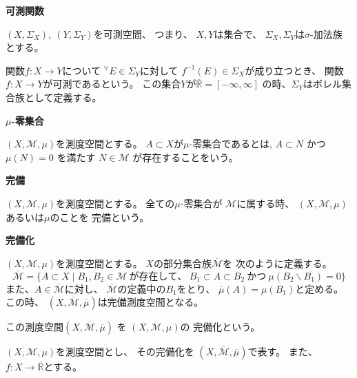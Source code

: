 \documentclass[12pt,b5paper]{ltjsarticle}
\begin{document}
\textbf{可測関数}

$(X,\Sigma_{X}), \: (Y,\Sigma_{Y})$を可測空間、
つまり、
$X,Y$は集合で、
$\Sigma_{X},\Sigma_{Y}$は$\sigma$-加法族
とする。

関数$f: X\to Y$について
${}^{\forall}E\in \Sigma_{Y}$に対して
$f^{-1}(E)\in\Sigma_{X}$が成り立つとき、
関数$f: X\to Y$が可測であるという。
この集合$Y$が$\overline{\mathbb{R}}=[-\infty,\infty]$
の時、$\Sigma_{Y}$はボレル集合族として定義する。



\textbf{$\mu$-零集合}

$(X, \mathcal{M}, \mu)$を測度空間とする。
$A\subset X$が$\mu$-零集合であるとは,
$A\subset N$
かつ
$\mu(N) = 0$
を満たす
$ N\in \mathcal{M}$
が存在することをいう。


\textbf{完備}

$(X, \mathcal{M}, \mu)$を測度空間とする。
全ての$\mu$-零集合が
$\mathcal{M}$に属する時、
$(X, \mathcal{M}, \mu)$
あるいは$\mu$のことを
完備という。


\textbf{完備化}

$(X, \mathcal{M}, \mu)$を測度空間とする。
$X$の部分集合族$\overline{\mathcal{M}}$を
次のように定義する。
\begin{equation}
 \overline{\mathcal{M}}
  =\{ A \subset X \mid B_{1},B_{2}\in\mathcal{M}
   \: が存在して、\:
  B_{1}\subset A \subset B_{2} \:かつ\: \mu (B_{2}\backslash B_{1}) =0 \}
\end{equation}
また、$A\in\overline{\mathcal{M}}$に対し、
$\overline{\mathcal{M}}$の定義中の$B_{1}$をとり、
$\overline{\mu}(A) = \mu(B_{1})$と定める。
この時、
$(X, \overline{\mathcal{M}}, \overline{\mu})$は完備測度空間となる。

この測度空間$(X, \overline{\mathcal{M}}, \overline{\mu})$
を
$(X, \mathcal{M}, \mu)$の
完備化という。




\hrulefill

$(X,\mathcal{M},\mu)$を測度空間とし、
その完備化を
$(X,\overline{\mathcal{M}},\overline{\mu})$で表す。
また、$f:X\to \overline{\mathbb{R}}$とする。
\end{document}
